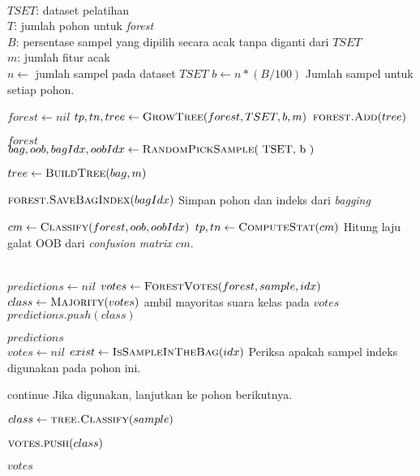 \begin{center}
\label{alg:rf}
	\begin{algorithmic}[1]
\Require \\
$ TSET $: dataset pelatihan \\
$ T $: jumlah pohon untuk \textit{forest} \\
$ B $: persentase sampel yang dipilih secara acak tanpa diganti dari $TSET$ \\
$ m $: jumlah fitur acak \\
\newpage
{}
	\State $ n \gets $ jumlah sampel pada dataset $ TSET $
	\State $ b \gets n * (B / 100) $
	\Comment Jumlah sampel untuk setiap pohon.

	\State $ forest \gets nil $
		\State $ tp, tn, tree \gets \Call{GrowTree}{forest, TSET, b, m} $
		\State $ \Call{forest.Add}{tree} $
	\EndFor
	
	\State \Return $forest$
\EndFunction
\\
	\label{bagging}
	\State $ bag, oob, bagIdx, oobIdx \gets \Call{RandomPickSample}{$ TSET,
	b $} $

	\State $ tree \gets \Call{BuildTree}{bag, m} $

	\State $ \Call{forest.SaveBagIndex}{bagIdx} $
	\Comment Simpan pohon dan indeks dari \textit{bagging}

	\State $ cm \gets \Call{Classify}{forest, oob, oobIdx} $
	\State $ tp, tn \gets \Call{ComputeStat}{cm} $
	\Comment Hitung laju galat OOB dari \textit{confusion matrix}
	$cm$.

	\State {}
\EndFunction
\\
	\State $ predictions \gets nil $
		\State $ votes \gets \Call{ForestVotes}{forest, sample, idx} $
		\State $ class \gets \Call{Majority}{votes} $
		\Comment ambil mayoritas suara kelas pada $votes$
		\State $ predictions.push(class) $
	\EndFor

	\State \Return $predictions$
\EndFunction
\\
	\State $ votes \gets nil $
		\State $ exist \gets \Call{IsSampleInTheBag}{idx} $
		\Comment Periksa apakah sampel indeks digunakan pada pohon ini.

			\State continue
			\Comment Jika digunakan, lanjutkan ke pohon berikutnya.
		\EndIf

		\State $ class \gets \Call{tree.Classify}{sample} $

		\State $ \Call{votes.push}{class} $
	\EndFor

	\State \Return $ votes $
\EndFunction
	\end{algorithmic}
\end{center}
